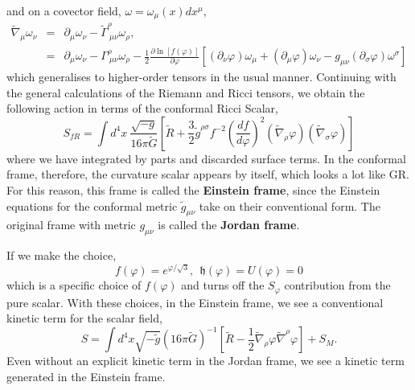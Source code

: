 and on a covector field, $\omega = \omega_{\mu} (x)dx^{\mu}$, 
\begin{eqnarray*}
    \tilde{\nabla}_{\mu}\omega_{\nu} &=& \partial_{\mu}\omega_{\nu} - \tilde{\Gamma}^{\rho}_{\ \mu\nu}\omega_{\rho},\\
    &=& \partial_{\mu}\omega_{\nu} - \Gamma^{\rho}_{\ \mu\nu}\omega_{\rho} - \frac{1}{2}\frac{\partial \ln[f(\varphi)]}{\partial \varphi}\left[(\partial_{\nu}\varphi)\omega_{\mu} + (\partial_{\mu}\varphi)\omega_{\nu} -g_{\mu\nu}(\partial_{\sigma}\varphi)\omega^{\sigma}\right]
\end{eqnarray*}
which generalises to higher-order tensors in the usual manner. Continuing with the general calculations of the Riemann and Ricci tensors, we obtain the following action in terms of the conformal Ricci Scalar,
\begin{equation}
    S_{fR}= \int d^4x\ \frac{\sqrt{-g}}{16\pi\tilde{G}}\left[\tilde{R} + \frac{3}{2}\tilde{g}^{\rho\sigma}f^{-2}\left(\frac{df}{d\varphi}\right)^2(\tilde{\nabla}_{\rho}\varphi)(\tilde{\nabla}_{\sigma}\varphi)\right]
\end{equation}
where we have integrated by parts and discarded surface terms. In the conformal frame, therefore, the curvature scalar appears by itself, which looks a lot like GR. For this reason, this frame is called the \textbf{Einstein frame}, since the Einstein equations for the conformal metric $\tilde{g}_{\mu\nu}$ take on their conventional form. The original frame with metric $g_{\mu\nu}$ is called the \textbf{Jordan frame}. 

If we make the choice,
\begin{equation}
    f(\varphi) = e^{\varphi/\sqrt{3}}, \ \ \mathfrak{h}(\varphi) = U(\varphi) = 0 
\end{equation}
which is a specific choice of $f(\varphi)$ and turns off the $S_{\varphi}$ contribution from the pure scalar. With these choices, in the Einstein frame, we see a conventional kinetic term for the scalar field,
\begin{equation}
    S = \int d^{4}x \sqrt{-\tilde{g}}(16\pi\tilde{G})^{-1}\left[\tilde{R} - \frac{1}{2}\tilde{\nabla}_{\rho}\varphi\tilde{\nabla}^{\rho}\varphi\right] + S_{M}.
\end{equation}
Even without an explicit kinetic term in the Jordan frame, we see a kinetic term generated in the Einstein frame. 

